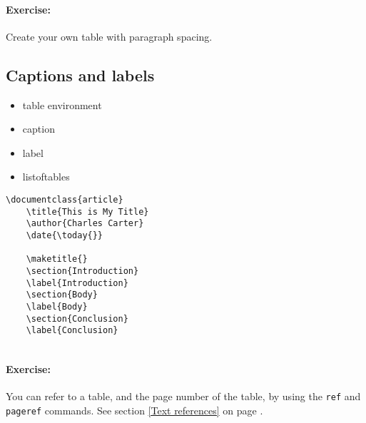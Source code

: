         \paragraph{Exercise:} Create your own table with paragraph spacing.

        \subsection{Captions and labels}
        \label{Captions and labels}
        
        \begin{framed}
            \begin{itemize}
                \item{table environment}
                \item{caption}
                \item{label}
                \item{listoftables}
            \end{itemize}
        \end{framed}


        \begin{verbatim}
\documentclass{article}
    \title{This is My Title}
    \author{Charles Carter}
    \date{\today{}}
 
    \maketitle{}
    \section{Introduction}
    \label{Introduction}
    \section{Body}
    \label{Body}
    \section{Conclusion}
    \label{Conclusion}
    
        \end{verbatim}

        \paragraph{Exercise:} You can refer to a table, and the page number of the table, by using the \texttt{ref} and \texttt{pageref} commands. See section \ref{Text references} on page \pageref{Text references}.

